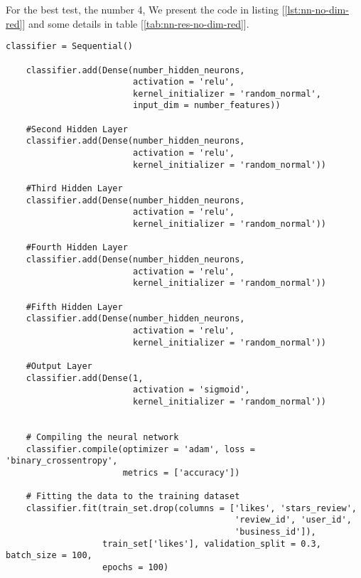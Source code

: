For the best test, the number 4, We present the code in listing [\ref{lst:nn-no-dim-red}] and some details in table [\ref{tab:nn-res-no-dim-red}].

\begin{lstlisting}[caption={Neural Network without dimensionality reduction},label={lst:nn-no-dim-red}]
    classifier = Sequential()
    
    classifier.add(Dense(number_hidden_neurons, 
                         activation = 'relu', 
                         kernel_initializer = 'random_normal', 
                         input_dim = number_features))
    
    #Second Hidden Layer
    classifier.add(Dense(number_hidden_neurons, 
                         activation = 'relu', 
                         kernel_initializer = 'random_normal'))
    
    #Third Hidden Layer
    classifier.add(Dense(number_hidden_neurons, 
                         activation = 'relu', 
                         kernel_initializer = 'random_normal'))

    #Fourth Hidden Layer
    classifier.add(Dense(number_hidden_neurons, 
                         activation = 'relu', 
                         kernel_initializer = 'random_normal'))
    
    #Fifth Hidden Layer
    classifier.add(Dense(number_hidden_neurons, 
                         activation = 'relu', 
                         kernel_initializer = 'random_normal'))
    
    #Output Layer
    classifier.add(Dense(1, 
                         activation = 'sigmoid', 
                         kernel_initializer = 'random_normal'))
    
    
    # Compiling the neural network
    classifier.compile(optimizer = 'adam', loss = 'binary_crossentropy',
                       metrics = ['accuracy'])
    
    # Fitting the data to the training dataset
    classifier.fit(train_set.drop(columns = ['likes', 'stars_review',
                                             'review_id', 'user_id', 
                                             'business_id']),
                   train_set['likes'], validation_split = 0.3, batch_size = 100,
                   epochs = 100)
\end{lstlisting}

